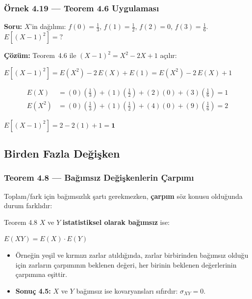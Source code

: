 ﻿\documentclass[light]{lutbeamer}
\begin{document}
\begin{frame}[fragile]
  \frametitle[Örnek 4.19]{Örnek 4.19 --- Teorem 4.6 Uygulaması}

  \smallskip
  \textbf{Soru:} $X$'in dağılımı: $f(0)=\tfrac{1}{3}$, $f(1)=\tfrac{1}{2}$, $f(2)=0$, $f(3)=\tfrac{1}{6}$. \; $E[(X-1)^2] = ?$

  \medskip
  \textbf{Çözüm:} Teorem~4.6 ile $(X-1)^2 = X^2 - 2X + 1$ açılır:
  \begin{center}
    $E[(X-1)^2] = E(X^2) - 2\,E(X) + E(1) = E(X^2) - 2\,E(X) + 1$
  \end{center}

  {\small
  \begin{align*}
    E(X) &= (0)\!\left(\tfrac{1}{3}\right) + (1)\!\left(\tfrac{1}{2}\right) + (2)(0) + (3)\!\left(\tfrac{1}{6}\right) = 1 \\[4pt]
    E(X^2) &= (0)\!\left(\tfrac{1}{3}\right) + (1)\!\left(\tfrac{1}{2}\right) + (4)(0) + (9)\!\left(\tfrac{1}{6}\right) = 2
  \end{align*}
  }
  \begin{center}
    $E[(X-1)^2] = 2 - 2(1) + 1 = \mathbf{1}$
  \end{center}
\end{frame}

\subsection{Birden Fazla Değişken}

\begin{frame}[fragile]
  \frametitle{Teorem 4.8 --- Bağımsız Değişkenlerin Çarpımı}
  Toplam/fark için bağımsızlık şartı gerekmezken, \textbf{çarpım} söz konusu olduğunda durum farklıdır:
  \begin{center}
    \begin{minipage}{0.9\textwidth}
      \begin{block}{Teorem 4.8}
        $X$ ve $Y$ \textbf{istatistiksel olarak bağımsız} ise:
        \begin{center}
          $E(XY) = E(X) \cdot E(Y)$
        \end{center}
      \end{block}
    \end{minipage}
  \end{center}

  \medskip
  \begin{itemize}
    \item Örneğin yeşil ve kırmızı zarlar atıldığında, zarlar birbirinden bağımsız olduğu için zarların çarpımının beklenen değeri, her birinin beklenen değerlerinin çarpımına eşittir.
    \item \textbf{Sonuç 4.5:} $X$ ve $Y$ bağımsız ise kovaryansları sıfırdır: $\sigma_{XY} = 0$.
  \end{itemize}
\end{frame}
\end{document}
